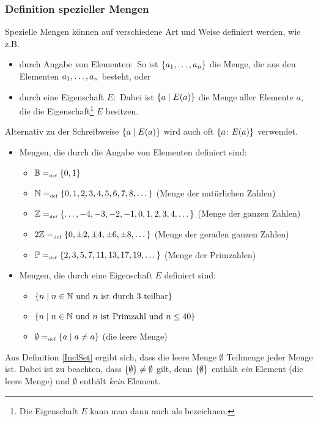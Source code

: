 \subsubsection{Definition spezieller Mengen}
\label{MengenDef}
Spezielle Mengen können auf verschiedene Art und Weise definiert
werden, wie z.B.
\begin{itemize}
%
\item durch Angabe von Elementen:\ So ist $\{{a_{1}}, \allowbreak \dots , \allowbreak{a_{n}}\}$ die Menge,
die aus den Elementen ${a_{1}}, \allowbreak \dots , \allowbreak{a_{n}}$ besteht, oder
%
\item durch eine Eigenschaft $E$:\ Dabei ist $\{a \mid E(a)\}$ die Menge
aller Elemente $a$, die die Eigenschaft\footnote{Die Eigenschaft $E$
kann man dann auch als  bezeichnen.} $E$ besitzen.
%
\end{itemize}
Alternativ zu der Schreibweise $\{a \mid E(a)\}$ wird auch oft 
$\{a \colon E(a)\}$ verwendet.


\begin{example}
\mbox{}

\begin{itemize}
%
\item Mengen, die durch die Angabe von Elementen definiert sind:
\begin{itemize}
  \item $\mathbb{B} =_{\mathrm{\scriptscriptstyle def}} \{0,1\}$
  \item $\mathbb N =_{\mathrm{\scriptscriptstyle def}} \{0, 1, 2, 3, 4, 5, 6, 7, 8, \dots\}$ (Menge der
  natürlichen Zahlen)\index{$\N$}
  \item $\mathbb Z =_{\mathrm{\scriptscriptstyle def}} \{\dots, -4, -3, -2, -1, 0, 1, 2, 3, 4, \dots\}$
  (Menge der ganzen Zahlen)\index{$\Z$}
  \item $2\mathbb Z =_{\mathrm{\scriptscriptstyle def}} \{0, \pm 2, \pm 4, \pm 6, \pm 8, \dots\}$
  (Menge der geraden ganzen Zahlen)\index{$2\Z$}
  \item $\mathbb{P} =_{\mathrm{\scriptscriptstyle def}} \{2, 3, 5, 7, 11, 13, 17, 19, \dots\}$
  (Menge der Primzahlen)\index{$\PRIM$}
\end{itemize}
%
\item Mengen, die durch eine Eigenschaft $E$ definiert sind:
\begin{itemize}
%
\item $\{n \mid n \in \mathbb N \text{ und $n$ ist durch $3$ teilbar}\}$
%
\item $\{n \mid n \in \mathbb N \text{ und $n$ ist Primzahl und $n \le 40$}\}$
%
\item $\emptyset =_{\mathrm{\scriptscriptstyle def}} \{a \mid a \not= a\}$ (die leere Menge)\index{$\emptyset$}
%
\end{itemize}
\end{itemize}
Aus Definition \ref{InclSet} ergibt sich, dass die leere Menge
$\emptyset$ Teilmenge jeder Menge ist. Dabei ist zu beachten, dass 
$\{\emptyset\} \not= \emptyset$\index{$\set{\emptyset}$} gilt, denn $\set{\emptyset}$ 
enthält \emph{ein} Element (die leere Menge) und $\emptyset$ enthält \emph{kein} Element.
\end{example}

